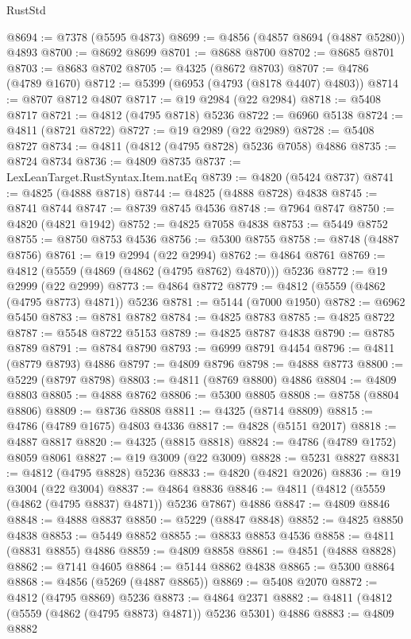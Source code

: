 \begin{lexlean}{RustStd}
\begin{coremodule}
{\begin{coremodule}
{{{{{{{{{{{{{{{{{{{{{{{{{{{{{{{{{{{{{{{{{{{{{{{{{{{{{{{{{{{{{{{{{{{{{{{{{{{{{{{{@8694 := @7378 (@5595 @4873)
@8699 := @4856 (@4857 @8694 (@4887 @5280)) @4893
@8700 := @8692 @8699
@8701 := @8688 @8700
@8702 := @8685 @8701
@8703 := @8683 @8702
@8705 := @4325 (@8672 @8703)
@8707 := @4786 (@4789 @1670)
@8712 := @5399 (@6953 (@4793 (@8178 @4407) @4803))
@8714 := @8707 @8712 @4807
@8717 := @19 @2984 (@22 @2984)
@8718 := @5408 @8717
@8721 := @4812 (@4795 @8718) @5236
@8722 := @6960 @5138
@8724 := @4811 (@8721 @8722)
@8727 := @19 @2989 (@22 @2989)
@8728 := @5408 @8727
@8734 := @4811 (@4812 (@4795 @8728) @5236 @7058) @4886
@8735 := @8724 @8734
@8736 := @4809 @8735
@8737 := LexLeanTarget.RustSyntax.Item.natEq
@8739 := @4820 (@5424 @8737)
@8741 := @4825 (@4888 @8718)
@8744 := @4825 (@4888 @8728) @4838
@8745 := @8741 @8744
@8747 := @8739 @8745 @4536
@8748 := @7964 @8747
@8750 := @4820 (@4821 @1942)
@8752 := @4825 @7058 @4838
@8753 := @5449 @8752
@8755 := @8750 @8753 @4536
@8756 := @5300 @8755
@8758 := @8748 (@4887 @8756)
@8761 := @19 @2994 (@22 @2994)
@8762 := @4864 @8761
@8769 := @4812 (@5559 (@4869 (@4862 (@4795 @8762) @4870))) @5236
@8772 := @19 @2999 (@22 @2999)
@8773 := @4864 @8772
@8779 := @4812 (@5559 (@4862 (@4795 @8773) @4871)) @5236
@8781 := @5144 (@7000 @1950)
@8782 := @6962 @5450
@8783 := @8781 @8782
@8784 := @4825 @8783
@8785 := @4825 @8722
@8787 := @5548 @8722 @5153
@8789 := @4825 @8787 @4838
@8790 := @8785 @8789
@8791 := @8784 @8790
@8793 := @6999 @8791 @4454
@8796 := @4811 (@8779 @8793) @4886
@8797 := @4809 @8796
@8798 := @4888 @8773
@8800 := @5229 (@8797 @8798)
@8803 := @4811 (@8769 @8800) @4886
@8804 := @4809 @8803
@8805 := @4888 @8762
@8806 := @5300 @8805
@8808 := @8758 (@8804 @8806)
@8809 := @8736 @8808
@8811 := @4325 (@8714 @8809)
@8815 := @4786 (@4789 @1675) @4803 @4336
@8817 := @4828 (@5151 @2017)
@8818 := @4887 @8817
@8820 := @4325 (@8815 @8818)
@8824 := @4786 (@4789 @1752) @8059 @8061
@8827 := @19 @3009 (@22 @3009)
@8828 := @5231 @8827
@8831 := @4812 (@4795 @8828) @5236
@8833 := @4820 (@4821 @2026)
@8836 := @19 @3004 (@22 @3004)
@8837 := @4864 @8836
@8846 := @4811 (@4812 (@5559 (@4862 (@4795 @8837) @4871)) @5236 @7867) @4886
@8847 := @4809 @8846
@8848 := @4888 @8837
@8850 := @5229 (@8847 @8848)
@8852 := @4825 @8850 @4838
@8853 := @5449 @8852
@8855 := @8833 @8853 @4536
@8858 := @4811 (@8831 @8855) @4886
@8859 := @4809 @8858
@8861 := @4851 (@4888 @8828)
@8862 := @7141 @4605
@8864 := @5144 @8862 @4838
@8865 := @5300 @8864
@8868 := @4856 (@5269 (@4887 @8865))
@8869 := @5408 @2070
@8872 := @4812 (@4795 @8869) @5236
@8873 := @4864 @2371
@8882 := @4811 (@4812 (@5559 (@4862 (@4795 @8873) @4871)) @5236 @5301) @4886
@8883 := @4809 @8882
}}}}}}}}}}}}}}}}}}}}}}}}}}}}}}}}}}}}}}}}}}}}}}}}}}}}}}}}}}}}}}}}}}}}}}}}}}}}}}}}
\end{coremodule}}
\end{coremodule}
\end{lexlean}
